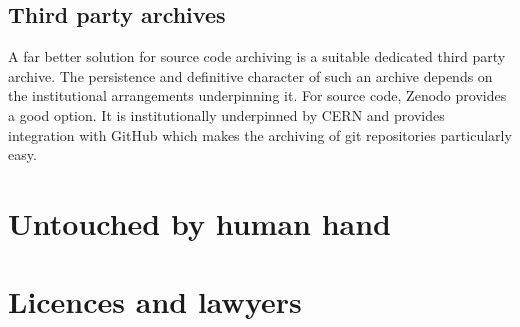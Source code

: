 \documentclass[a4paper,11pt]{article}
\begin{document}
\subsection{Third party archives}

A far better solution for source code archiving is a suitable dedicated
third party archive. The persistence and definitive character of such an
archive depends on the institutional arrangements underpinning it. For
source code, Zenodo provides a good option. It is institutionally
underpinned by CERN and provides integration with GitHub which makes the
archiving of git repositories particularly easy. 



\section{Untouched by human hand}

\section{Licences and lawyers}
\end{document}
